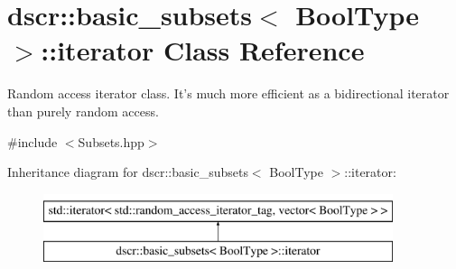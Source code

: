 \hypertarget{classdscr_1_1basic__subsets_1_1iterator}{\section{dscr\-:\-:basic\-\_\-subsets$<$ Bool\-Type $>$\-:\-:iterator Class Reference}
\label{classdscr_1_1basic__subsets_1_1iterator}
}


Random access iterator class. It's much more efficient as a bidirectional iterator than purely random access.  




{\ttfamily \#include $<$Subsets.\-hpp$>$}

Inheritance diagram for dscr\-:\-:basic\-\_\-subsets$<$ Bool\-Type $>$\-:\-:iterator\-:\begin{figure}[H]
\begin{center}
\leavevmode
\includegraphics[height=2.000000cm]{classdscr_1_1basic__subsets_1_1iterator}
\end{center}
\end{figure}
